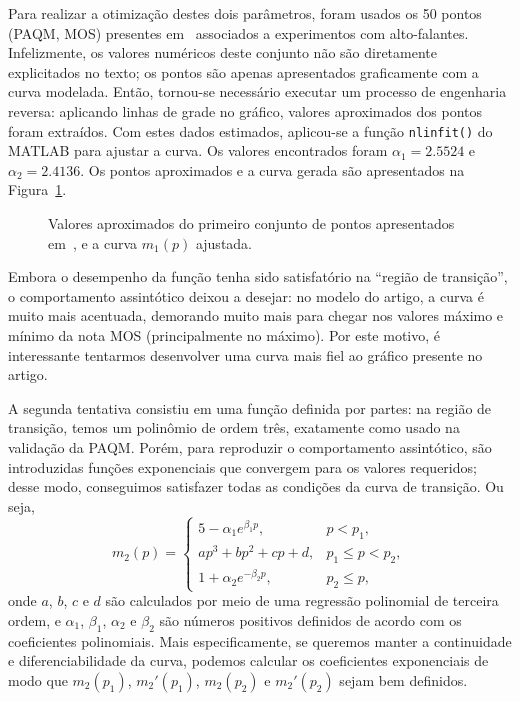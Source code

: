 Para realizar a otimização destes dois parâmetros, foram usados os 50 pontos (PAQM,
MOS) presentes em~\cite{beerends-2002} associados a experimentos com alto-falantes.
Infelizmente, os valores numéricos deste conjunto não são diretamente explicitados no
texto; os pontos são apenas apresentados graficamente com a curva modelada. Então,
tornou-se necessário executar um processo de engenharia reversa: aplicando linhas de
grade no gráfico, valores aproximados dos pontos foram extraídos. Com estes dados
estimados, aplicou-se a função \texttt{nlinfit()} do MATLAB para ajustar a curva. Os
valores encontrados foram $\alpha_1 = 2.5524$ e $\alpha_2 = 2.4136$. Os pontos
aproximados e a curva gerada são apresentados na Figura~\ref{fig:paqmtomos:sigmoid2}.

\begin{figure}[!ht]
	\centering
	
	\caption[Sigmoide com dois parâmetros de conversão de PAQM para MOS]{Valores aproximados do primeiro conjunto de pontos apresentados em~\cite{beerends-2002}, e a curva $m_1(p)$ ajustada.}
	\label{fig:paqmtomos:sigmoid2}
\end{figure}

Embora o desempenho da função tenha sido satisfatório na ``região de transição'', o
comportamento assintótico deixou a desejar: no modelo do artigo, a curva é muito mais
acentuada, demorando muito mais para chegar nos valores máximo e mínimo da nota MOS
(principalmente no máximo). Por este motivo, é interessante tentarmos desenvolver uma
curva mais fiel ao gráfico presente no artigo.

A segunda tentativa consistiu em uma função definida por partes: na região de
transição, temos um polinômio de ordem três, exatamente como usado na validação da
PAQM. Porém, para reproduzir o comportamento assintótico, são introduzidas funções
exponenciais que convergem para os valores requeridos; desse modo, conseguimos
satisfazer todas as condições da curva de transição. Ou seja,
\begin{equation}
	m_2(p) = \begin{cases}
		5 - \alpha_1 e^{\beta_1 p},  & p < p_1,          \\
		a p^3 + b p^2 + c p + d,     & p_1 \leq p < p_2, \\
		1 + \alpha_2 e^{-\beta_2 p}, & p_2 \leq p,
	\end{cases}
\end{equation}
onde $a$, $b$, $c$ e $d$ são calculados por meio de uma regressão polinomial de terceira ordem, e $\alpha_1$, $\beta_1$, $\alpha_2$ e $\beta_2$ são números positivos definidos de acordo com os coeficientes polinomiais. Mais especificamente, se queremos manter a continuidade e diferenciabilidade da curva, podemos calcular os coeficientes exponenciais de modo que $m_2(p_1)$, $m_2'(p_1)$, $m_2(p_2)$ e $m_2'(p_2)$ sejam bem definidos.

